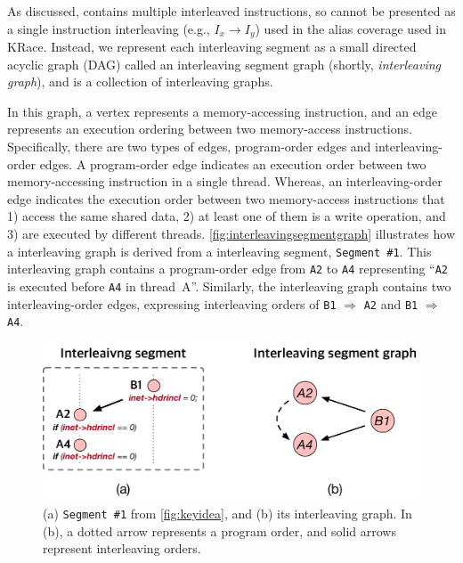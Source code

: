 As discussed, \intcov contains multiple interleaved instructions, 
so \intcov cannot be presented as a single instruction interleaving 
(e.g., $I_x \rightarrow I_y$) used in the alias coverage used in KRace.
Instead, we represent each interleaving segment as a small directed acyclic
graph (DAG) called an interleaving segment graph (shortly, \textit{interleaving graph}), and \intcov is a collection of interleaving graphs.

In this graph, a vertex represents a memory-accessing instruction, 
and an edge represents an execution ordering between two memory-access instructions. 
Specifically, there are two types of edges, program-order edges and
interleaving-order edges.
%
A program-order edge indicates an execution order between two 
memory-accessing instruction in a single thread.
Whereas, an interleaving-order edge indicates the execution
order between two memory-access instructions that 1) access the same
shared data, 2) at least one of them is a write operation, and 3) are
executed by different threads.
\autoref{fig:interleavingsegmentgraph} illustrates how a interleaving 
graph is derived from a interleaving segment, \texttt{Segment \#1}.
This interleaving graph contains a program-order edge from \texttt{A2} to
\texttt{A4} representing ``\texttt{A2} is executed before \texttt{A4}
in thread~A''.
Similarly, the interleaving graph contains two interleaving-order
edges, expressing interleaving orders of \texttt{B1} $\Rightarrow$ \texttt{A2}
and \texttt{B1} $\Rightarrow$ \texttt{A4}.



\begin{figure}[t]
  \centering
  \includegraphics[width=0.9\linewidth]{fig/interleavingsegmentgraph.pdf}
  \caption{(a) \texttt{Segment \#1} from \autoref{fig:keyidea}, and
    (b) its interleaving graph. In (b), a dotted arrow represents a
    program order, and solid arrows represent interleaving orders.}
  \label{fig:interleavingsegmentgraph}
\end{figure}

